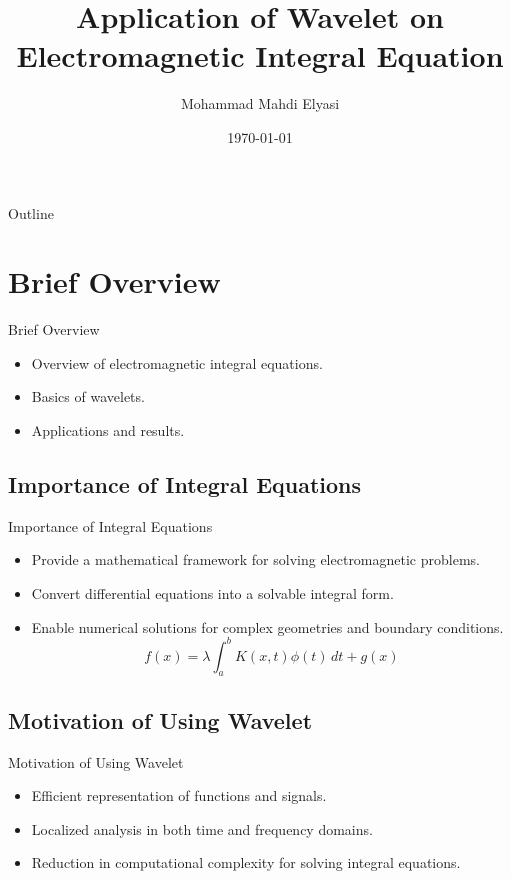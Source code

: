 \documentclass{beamer}
\title[Wavelet on Integral Equation]{Application of Wavelet on Electromagnetic Integral Equation}
\author[]{Mohammad Mahdi Elyasi}
\institute[Amirkabir University of Techonology]{
    Supervisor: Dr. Moradi \\[1cm] %
    Faculty of Electrical Engineering \\ %
}
\date{\today} %
\begin{document}
\begin{frame}
    
    \titlepage
\end{frame}

\begin{frame}{Outline}
    \tableofcontents
\end{frame}

\section{Brief Overview}
\begin{frame}{Brief Overview}
    \begin{itemize}
        \vspace*{-\baselineskip}
        \item Overview of electromagnetic integral equations.
        \item Basics of wavelets.
        \item Applications and results.
    \end{itemize}
\end{frame}

\subsection{Importance of Integral Equations}
\begin{frame}{Importance of Integral Equations}
    \begin{itemize}
        \item Provide a mathematical framework for solving electromagnetic problems.
        \item Convert differential equations into a solvable integral form.
        \item Enable numerical solutions for complex geometries and boundary conditions.
        \[
              f(x) = \lambda \int_a^b K(x, t)\phi(t) \,dt + g(x)
        \]
    \end{itemize}
\end{frame}

\subsection{Motivation of Using Wavelet}
\begin{frame}{Motivation of Using Wavelet}
    \begin{itemize}
        \item Efficient representation of functions and signals.
        \item Localized analysis in both time and frequency domains.
        \item Reduction in computational complexity for solving integral equations.
        
    \end{itemize}
\end{frame}
\end{document}
